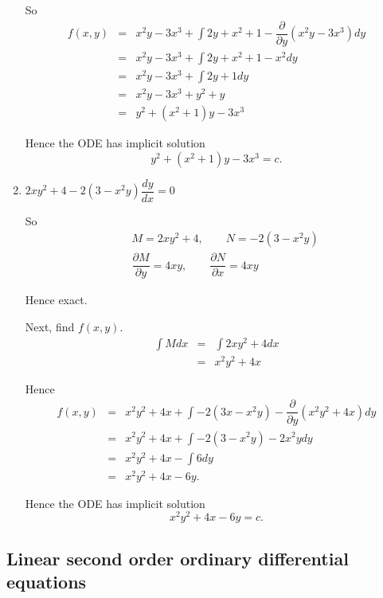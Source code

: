 \begin{examples}
\begin{enumerate}
  So
  \begin{eqnarray*}
   f(x,y) &=& x^2y - 3x^3 + \int 2y + x^2 + 1 - \dfrac{\partial}{\partial y} (x^2y-3x^3)dy\\
   &=& x^2y - 3x^3 + \int 2y + x^2 + 1 - x^2 dy\\
   &=& x^2y - 3x^3 + \int 2y + 1 dy\\
   &=& x^2y - 3x^3 + y^2 + y\\
   &=& y^2 + (x^2+1)y - 3x^3
  \end{eqnarray*}

  Hence the ODE has implicit solution 
  \[
   y^2 + (x^2+1) y - 3x^3 = c.
  \]

  \item $2xy^2 + 4 - 2(3-x^2y) \dfrac{dy}{dx} = 0$
  
    So
  \begin{eqnarray*}
&&   M=2xy^2+4, \qquad N=-2(3-x^2y)\\
&&   \dfrac{\partial M}{\partial y} = 4xy, \qquad \dfrac{\partial N}{\partial x}=4xy
  \end{eqnarray*}

  Hence exact.

  Next, find $f(x,y)$.
  \begin{eqnarray*}
   \int M dx &=& \int 2xy^2 + 4 dx\\
   &=& x^2 y^2 + 4x
  \end{eqnarray*}

  Hence
  \begin{eqnarray*}
   f(x,y) &=& x^2 y^2 + 4x + \int -2(3x-x^2y) - \dfrac{\partial}{\partial y} (x^2y^2+4x)dy\\
   &=& x^2y^2 + 4x + \int -2(3-x^2y) -2x^2ydy\\
   &=& x^2y^2 + 4x -\int 6dy\\
   &=& x^2y^2 + 4x - 6y.
  \end{eqnarray*}

  Hence the ODE has implicit solution
  \[
   x^2y^2 + 4x - 6y = c.
  \]

 \end{enumerate}
\end{examples}




\subsection{Linear second order ordinary differential equations}

